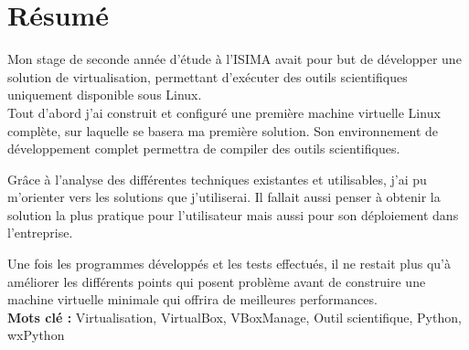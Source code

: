 \cleardoublepage



\chapter*{Résumé}

\thispagestyle{empty}



Mon stage de seconde année d'étude à l'ISIMA avait pour but de développer une solution de virtualisation, permettant d'exécuter des outils scientifiques uniquement disponible sous Linux.
\\


Tout d'abord j'ai construit et configuré une première machine virtuelle Linux complète, sur laquelle se basera ma première solution.
Son environnement de développement complet permettra de compiler des outils scientifiques.

Grâce à l'analyse des différentes techniques existantes et utilisables, j'ai pu m'orienter vers les solutions que j'utiliserai.
Il fallait aussi penser à obtenir la solution la plus pratique pour l'utilisateur mais aussi pour son déploiement dans l'entreprise.

Une fois les programmes développés et les tests effectués, il ne restait plus qu'à améliorer les différents points qui posent problème avant de construire une machine virtuelle minimale qui offrira de meilleures performances.
\\



\textbf{Mots clé : }
Virtualisation, VirtualBox, VBoxManage, Outil scientifique, Python, wxPython